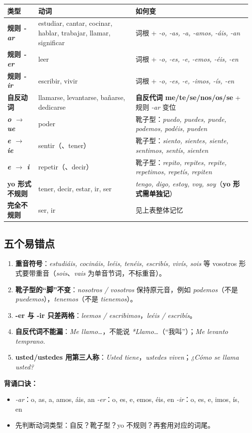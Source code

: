 \documentclass[a4paper,11pt]{ctexart}
\renewcommand{\arraystretch}{1.28}
\newcommand{\ir}[1]{\textbf{\textcolor{accent}{#1}}}
\newcommand{\es}[1]{\textit{#1}}
\begin{document}
\begin{center}
\small
\renewcommand{\arraystretch}{1.3}
\begin{tabular}{@{}>{\bfseries}p{2.6cm}p{3.7cm}p{9.8cm}@{}}
\toprule
类型 & 动词 & 如何变 \\
\midrule
规则 \es{-ar} & estudiar, cantar, cocinar, hablar, trabajar, llamar, significar & 词根 + \es{-o, -as, -a, -amos, -áis, -an} \\
规则 \es{-er} & leer & 词根 + \es{-o, -es, -e, -emos, -éis, -en} \\
规则 \es{-ir} & escribir, vivir & 词根 + \es{-o, -es, -e, -imos, -ís, -en} \\
自反动词 & llamarse, levantarse, bañarse, dedicarse & \textbf{自反代词 me/te/se/nos/os/se} + 规则 \es{-ar} 变位 \\
\es{o $\to$ ue} & poder & 靴子型：\es{puedo, puedes, puede, podemos, podéis, pueden} \\
\es{e $\to$ ie} & sentir（、tener） & 靴子型：\es{siento, sientes, siente, sentimos, sentís, sienten} \\
\es{e $\to$ i} & repetir（、decir） & 靴子型：\es{repito, repites, repite, repetimos, repetís, repiten} \\
yo 形式不规则 & tener, decir, estar, ir, ser & \es{tengo, digo, estoy, voy, soy}（\ir{yo 形式需单独记}） \\
完全不规则 & ser, ir & 见上表整体记忆 \\
\bottomrule
\end{tabular}
\end{center}

\subsection{五个易错点}

\begin{enumerate}[leftmargin=1.5em,itemsep=2pt]
  \item \textbf{重音符号}：\es{estudiáis, cocináis, leéis, tenéis, escribís, vivís, sois} 等 vosotros 形式要带重音（\es{sois}、\es{vais} 为单音节词，不标重音）。
  \item \textbf{靴子型的“脚”不变}：\es{nosotros / vosotros} 保持原元音，例如 \es{podemos}（不是 \es{puedemos}），\es{tenemos}（不是 \es{tienemos}）。
  \item \textbf{-er 与 -ir 只差两格}：\es{leemos / escribimos}，\es{leéis / escribís}。
  \item \textbf{自反代词不能漏}：\es{Me llamo\ldots}，不能说 \es{*Llamo\ldots}（“我叫”）；\es{Me levanto temprano.}
  \item \textbf{usted/ustedes 用第三人称}：\es{Usted tiene}，\es{ustedes viven}；\es{¿Cómo se llama usted?}
\end{enumerate}

\begin{tip}
\textbf{背诵口诀：}
\begin{itemize}[leftmargin=1.3em,itemsep=1pt,topsep=2pt]
  \item \es{-ar}：o, as, a, amos, áis, an \hfill \es{-er}：o, es, e, emos, éis, en \hfill \es{-ir}：o, es, e, imos, ís, en
  \item 先判断动词类型：自反？靴子型？yo 不规则？再套用对应的词尾。
\end{itemize}
\end{tip}
\end{document}
